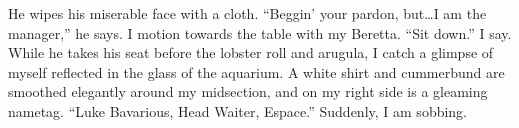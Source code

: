 He wipes his miserable face with a cloth. ``Beggin' your
pardon, but{\ldots}I am the manager,'' he says. I motion
towards the table with my Beretta. ``Sit down.'' I say.
While he takes his seat before the lobster roll and arugula, I
catch a glimpse of myself reflected in the glass of the aquarium. A
white shirt and cummerbund are smoothed elegantly around my
midsection, and on my right side is a gleaming nametag. ``Luke
Bavarious, Head Waiter, Espace.'' Suddenly, I am sobbing. 

 



